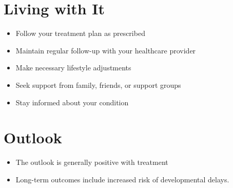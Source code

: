 \section{Living with It}
\begin{itemize}[noitemsep]
  \item Follow your treatment plan as prescribed
  \item Maintain regular follow-up with your healthcare provider
  \item Make necessary lifestyle adjustments
  \item Seek support from family, friends, or support groups
  \item Stay informed about your condition
\end{itemize}
\section{Outlook}
\begin{itemize}[noitemsep]
  \item The outlook is generally positive with treatment
  \item Long-term outcomes include increased risk of developmental delays.
\end{itemize}
